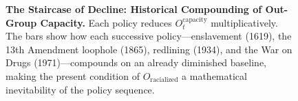 \begin{figure}[htbp]
\caption{\textbf{The Staircase of Decline: Historical Compounding of Out-Group Capacity.} Each policy reduces $O_t^{\text{capacity}}$ multiplicatively. The bars show how each successive policy---enslavement (1619), the 13th Amendment loophole (1865), redlining (1934), and the War on Drugs (1971)---compounds on an already diminished baseline, making the present condition of $O_{\text{racialized}}$ a mathematical inevitability of the policy sequence.}
\label{fig:historical_compounding}
\end{figure}

